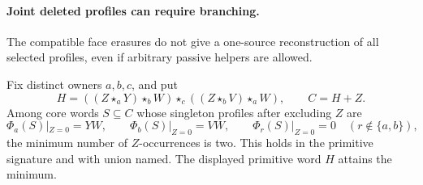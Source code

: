 \paragraph{Joint deleted profiles can require branching.}
The compatible face erasures do not give a one-source reconstruction of
all selected profiles, even if arbitrary passive helpers are allowed.

\begin{proposition}
\label{core:prop:joint-profile-repetition}
Fix distinct owners $a,b,c$, and put
\[
 H=((Z\star_aY)\star_bW)\star_c((Z\star_bV)\star_aW),
 \qquad C=H+Z.
\]
Among core words $S\subseteq C$ whose singleton profiles after excluding
$Z$ are
\[
 \Phi_a(S)|_{Z=0}=YW,\qquad
 \Phi_b(S)|_{Z=0}=VW,\qquad
 \Phi_r(S)|_{Z=0}=0\quad(r\notin\{a,b\}),
\]
the minimum number of $Z$-occurrences is two. This holds in the primitive
signature and with union named. The displayed primitive word $H$ attains
the minimum.
\end{proposition}
